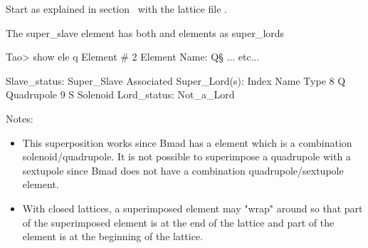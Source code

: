 \documentclass{hitec}
\begin{document}
Start \tao as explained in section~ with the lattice file
.


The  super_slave element has both  and  elements as super_lords
\begin{code}
Tao> show ele q\s
 Element #                2
 Element Name: Q\S
... etc...

Slave_status: Super_Slave
Associated Super_Lord(s):
   Index   Name                             Type
       8   Q                                Quadrupole
       9   S                                Solenoid
Lord_status:  Not_a_Lord
\end{code}

Notes:
\begin{itemize}
\item This superposition works since Bmad has a  element which is a combination solenoid/quadrupole. It is not possible
to superimpose a quadrupole with a sextupole since Bmad does not have a combination quadrupole/sextupole element.
\item With closed lattices, a superimposed element may "wrap" around so that part of the superimposed element is at the end of the lattice
and part of the element is at the beginning of the lattice.
\end{itemize}
\end{document}
